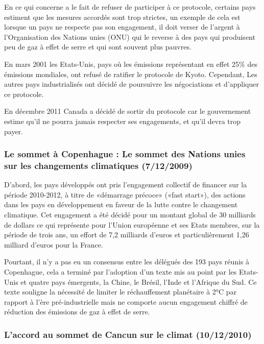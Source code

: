 \documentclass[a4paper,10pt]{article}
\begin{document}
En ce qui concerne  a le fait de refuser de participer  à ce protocole, certains
pays estiment  que les mesures accordés  sont trop strictes, un  exemple de cela
est lorsque un pays ne respecte pas son engagement, il doit verser de l’argent à
l’Organisation des Nations unies (ONU) qui  le reverse à des pays qui produisent
peu de gaz à effet de serre et qui sont souvent plus pauvres.


En mars  2001 les Etats-Unis, pays  où les émissions représentant  en effet 25\%
des   émissions   mondiales,   ont   refusé   de  ratifier   le   protocole   de
Kyoto. Cependant,  Les autres pays  industrialisés ont décidé de  poursuivre les
négociations et d'appliquer ce protocole.


En décembre  2011 Canada  a décidé  de sortir du  protocole car  le gouvernement
estime qu’il  ne pourra  jamais respecter ses  engagements, et qu’il  devra trop
payer.


\subsubsection[Le sommet à Copenhague]{Le sommet à Copenhague : Le sommet des Nations unies sur les changements climatiques (7/12/2009)}

D’abord, les pays développés ont  pris l'engagement collectif de financer sur la
période 2010-2012,  à titre de  «démarrage précoce» («fast start»),  des actions
dans  les pays  en développement  en  faveur de  la lutte  contre le  changement
climatique. Cet engagement a été décidé pour un montant global de 30 milliards
de dollars ce  qui représente pour l'Union européenne et  ses Etats membres, sur
la période de trois ans, un effort de 7,2 milliards d'euros et particulièrement
1,26 milliard d'euros pour la France. 

Pourtant, il n’y a pas eu un  consensus entre les délégués des 193 pays réunis à
Copenhague,  cela a  terminé par  l’adoption  d’un texte  mis au  point par  les
Etats-Unis et quatre pays émergents, la Chine, le Brésil, l'Inde et l'Afrique du
Sud. Ce texte souligne la nécessité de limiter le réchauffement planétaire à 2°C
par rapport à  l’ère pré-industrielle mais ne comporte  aucun engagement chiffré
de réduction des émissions de gaz à effet de serre. 


\subsubsection[L’accord au sommet de Cancun sur le climat]{L’accord au sommet de Cancun sur le climat (10/12/2010)}
\end{document}
